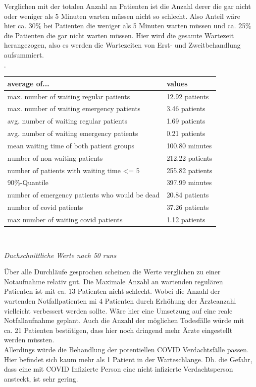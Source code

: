 \documentclass{article}
\begin{document}
Verglichen mit der totalen Anzahl an Patienten ist die Anzahl derer die gar nicht oder weniger als 5 Minuten warten müssen nicht so schlecht. Also Anteil wäre hier ca. 30\% bei Patienten die weniger als 5 Minuten warten müssen und ca. 25\% die Patienten die gar nicht warten müssen. Hier wird die gesamte Wartezeit herangezogen, also es werden die Wartezeiten von Erst- und Zweitbehandlung aufsummiert. \\
.\\

\begin{tabular}{|l|l|}
\hline
\textbf{average of...} & \textbf{values}\\ \hline
max. number of waiting regular patients & 12.92 patients  \\ \hline
max. number of waiting emergency patients & 3.46 patients  \\ \hline
avg. number of waiting regular patients & 1.69 patients  \\ \hline
avg. number of waiting emergency patients & 0.21 patients  \\ \hline
mean waiting time of both patient groups & 100.80 minutes  \\ \hline
number of non-waiting patients & 212.22 patients  \\ \hline
number of patients with waiting time <= 5 & 255.82 patients  \\ \hline
90\%-Quantile & 397.99 minutes  \\ \hline
number of emergency patients who would be dead & 20.84 patients  \\ \hline
number of covid patients & 37.26 patients  \\ \hline
max number of waiting covid patients & 1.12 patients  \\ \hline
\end{tabular}\\
\begin{center}
\textit{Duchschnittliche Werte nach 50 runs}\\
\end{center}
Über alle Durchläufe gesprochen scheinen die Werte verglichen zu einer Notaufnahme relativ gut. Die Maximale Anzahl an wartenden regulären Patienten ist mit ca. 13 Patienten nicht schlecht. Wobei die Anzahl der wartenden Notfallpatienten mi 4 Patienten durch Erhöhung der Ärzteanzahl vielleicht verbessert werden sollte. Wäre hier eine Umsetzung auf eine reale Notfallaufnahme geplant. Auch die Anzahl der möglichen Todesfälle würde mit ca. 21 Patienten bestätigen, dass hier noch dringend mehr Ärzte eingestellt werden müssten. \\
Allerdings würde die Behandlung der potentiellen COVID Verdachtsfälle passen. Hier befindet sich kaum mehr als 1 Patient in der Warteschlange. Dh. die Gefahr, dass eine mit COVID Infizierte Person eine nicht infizierte Verdachtsperson ansteckt, ist sehr gering.
\end{document}
